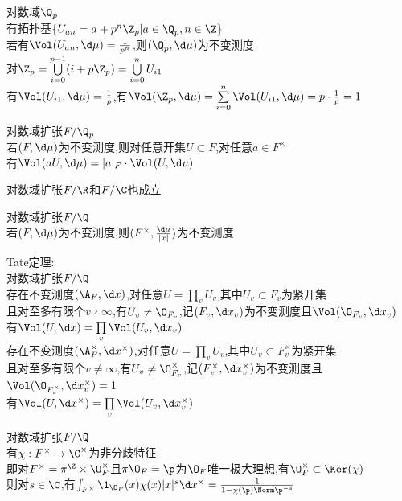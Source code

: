 \begin{dingyi}
对数域$\Q_{p}$\\
有拓扑基$\{U_{an}=a+p^n\Z_{p}|a\in\Q_{p},n\in \Z\}$\\
若有$\Vol(U_{an},\d\mu)=\frac{1}{p^n}$,则$(\Q_{p},\d\mu)$为不变测度\\
对$\Z_{p}=\bigcup\limits_{i=0}^{p-1}(i+p\Z_{p})=\bigcup\limits_{i=0}^{n}U_{i1}$\\
有$\Vol(U_{i1},\d\mu)=\frac{1}{p}$,有$\Vol(\Z_{p},\d\mu)=\sum\limits_{i=0}^{n}\Vol(U_{i1},\d\mu)=p\cdot\frac{1}{p}=1$
\end{dingyi}

\begin{dingli}
对数域扩张$F/\Q_{p}$\\
若$(F,\d\mu)$为不变测度,则对任意开集$U\subset F$,对任意$a\in F^{\times}$\\
有$\Vol(aU,\d\mu)=|a|_{F}\cdot\Vol(U,\d\mu)$
\end{dingli}

\begin{zhu}
对数域扩张$F/\R$和$F/\C$也成立
\end{zhu}

\begin{dingli}
对数域扩张$F/\Q$\\
若$(F,\d\mu)$为不变测度,则$(F^{\times},\frac{\d\mu}{|x|})$为不变测度
\end{dingli}

\begin{dingli}
Tate定理:\\
对数域扩张$F/\Q$\\
存在不变测度$(\A_{F},\d x)$,对任意$U=\prod\limits_{v}U_{v}$,其中$U_{v}\subset F_{v}$为紧开集\\
且对至多有限个$v\nmid \infty$,有$U_{v}\neq\O_{F_v}$,记$(F_{v},\d x_{v})$为不变测度且$\Vol(\O_{F_{v}},\d x_{v})$\\
有$\Vol(U,\d x)=\prod\limits_{v}\Vol(U_{v},\d x_{v})$\\
存在不变测度$(\A_{F}^{\times},\d x^{\times})$,对任意$U=\prod\limits_{v}U_{v}$,其中$U_{v}\subset F_{v}^{\times}$为紧开集\\
且对至多有限个$v\neq \infty$,有$U_{v}\neq \O_{F_{v}}^{\times}$,记$(F_{v}^{\times},\d x_{v}^{\times})$为不变测度且$\Vol(\O_{F_{v}^{\times}},\d x_{v}^{\times})=1$\\
有$\Vol(U,\d x^{\times})=\prod\limits_{v}\Vol(U_{v},\d x_{v}^{\times})$
\end{dingli}

\begin{dingli}
对数域扩张$F/\Q$\\
有$\chi:F^{\times}\to\C^{\times}$为非分歧特征\\
即对$F^{\times}=\pi^{\Z}\times\O_{F}^{\times}$且$\pi\O_{F}=\p$为$\O_{F}$唯一极大理想,有$\O_{F}^{\times}\subset \Ker(\chi)$\\
则对$s\in \C$,有$\int_{F^{\times}}\1_{\O_{F}}(x)\chi(x)|x|^{s}\d x^{\times}=\frac{1}{1-\chi(\p)\Norm\p^{-s}}$
\end{dingli}

